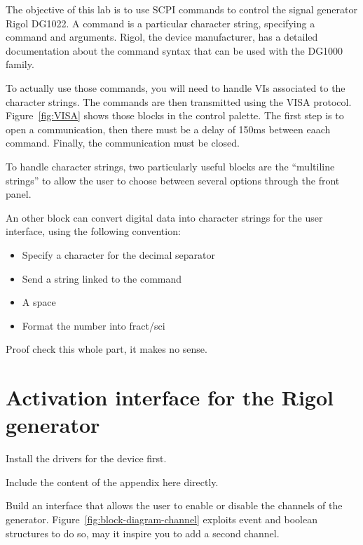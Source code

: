 \documentclass{labo}
\author{GEI}
\begin{document}

The objective of this lab is to use SCPI commands to control the signal generator Rigol DG1022.
A command is a particular character string, specifying a command and arguments.
Rigol, the device manufacturer, has a detailed documentation about the command syntax that can be used with the DG1000 family.


To actually use those commands, you will need to handle VIs associated to the character strings.
The commands are then transmitted using the VISA protocol.
Figure~\ref{fig:VISA} shows those blocks in the control palette.
The first step is to open a communication, then there must be a delay of 150ms between eaach command.
Finally, the communication must be closed.

To handle character strings, two particularly useful blocks are the ``multiline strings'' to allow the user to choose between several options through the front panel.


An other block can convert digital data into character strings for the user interface, using the following convention:
\begin{itemize}
  \item Specify a character for the decimal separator
  \item Send a string linked to the command
  \item A space
  \item Format the number into fract/sci
\end{itemize}

\begin{framed}
  Proof check this whole part, it makes no sense.
\end{framed}



\section{Activation interface for the Rigol generator}
Install the drivers for the device first.
\begin{framed}
Include the content of the appendix here directly.
\end{framed}

Build an interface that allows the user to enable or disable the channels of the generator.
Figure~\ref{fig:block-diagram-channel} exploits event and boolean structures to do so, may it inspire you to add a second channel.
\end{document}
